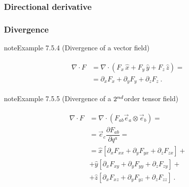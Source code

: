 \documentclass[letterpaper,10pt,english]{jupyterBook}
\begin{document}
\subsubsection{Directional derivative}
\label{\detokenize{ch/tensor-algebra-calculus/calculus-euclidean-cartesian:directional-derivative}}

\subsubsection{Divergence}
\label{\detokenize{ch/tensor-algebra-calculus/calculus-euclidean-cartesian:divergence}}\label{\detokenize{ch/tensor-algebra-calculus/calculus-euclidean-cartesian:tensor-calculus-cartesian-differential-operators-divergence}}\label{ch/tensor-algebra-calculus/calculus-euclidean-cartesian:example-3}
\begin{sphinxadmonition}{note}{Example 7.5.4 (Divergence of a vector field)}


\begin{equation*}
\begin{split}\begin{aligned}
 \nabla \cdot F 
  & = \nabla \cdot \left( F_x \, \hat{x} + F_y \, \hat{y} + F_z \, \hat{z} \right) = \\
  & = \partial_x F_x + \partial_y F_y + \partial_z F_z \ .
\end{aligned}\end{split}
\end{equation*}\end{sphinxadmonition}
\label{ch/tensor-algebra-calculus/calculus-euclidean-cartesian:example-4}
\begin{sphinxadmonition}{note}{Example 7.5.5 (Divergence of a \protect\(2^{nd}\protect\)\sphinxhyphen{}order tensor field)}


\begin{equation*}
\begin{split}\begin{aligned}
 \nabla \cdot F 
  & = \nabla \cdot \left( F_{ab} \vec{e}_a \otimes \vec{e}_b \right) = \\
  & = \vec{e}_c \dfrac{\partial F_{ab}}{\partial q^a} = \\
  & = \hat{x} \left[ \partial_x F_{xx} + \partial_y F_{yx} + \partial_z F_{zx} \right] + \\ 
  & + \hat{y} \left[ \partial_x F_{xy} + \partial_y F_{yy} + \partial_z F_{zy} \right] + \\ 
  & + \hat{z} \left[ \partial_x F_{xz} + \partial_y F_{yz} + \partial_z F_{zz} \right] \ .
\end{aligned}\end{split}
\end{equation*}\end{sphinxadmonition}
\end{document}
